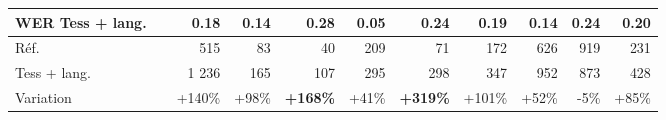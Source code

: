 {\begin{tabular}{|l|ccc|ccc|ccc|}
  WER Tess + lang.\ \ &
  \multicolumn{1}{r|}{0.18 }&
  \multicolumn{1}{r|}{0.14} &
  \multicolumn{1}{r|}{\textbf{0.28}} &
  \multicolumn{1}{r|}{0.05} &
   \multicolumn{1}{r|}{\textbf{0.24}} &
  \multicolumn{1}{r|}{0.19} &
  \multicolumn{1}{r|}{0.14} &
  \multicolumn{1}{r|}{0.24}&
  \multicolumn{1}{r|}{0.20} 
   \\ \hline
   \hline
Réf.\ &
    \multicolumn{1}{r|}{ 515}&
  \multicolumn{1}{r|}{83} &
  \multicolumn{1}{r|}{40} &
  \multicolumn{1}{r|}{209} &
  \multicolumn{1}{r|}{71} &
  \multicolumn{1}{r|}{172} &
  \multicolumn{1}{r|}{626} &
  \multicolumn{1}{r|}{919}&
  \multicolumn{1}{r|}{231} 
   \\ \hline
Tess + lang.\ &
    \multicolumn{1}{r|}{1 236} &
  \multicolumn{1}{r|}{165} &
  \multicolumn{1}{r|}{107} &
  \multicolumn{1}{r|}{295} &
  \multicolumn{1}{r|}{298} &
  \multicolumn{1}{r|}{347} &
  \multicolumn{1}{r|}{952} &
  \multicolumn{1}{r|}{873}&
  \multicolumn{1}{r|}{428} 
   \\ \hline
Variation & \multicolumn{1}{r|}{+140\%}&
\multicolumn{1}{r|}{+98\%}&
\multicolumn{1}{r|}{\textbf{+168\%}}&
\multicolumn{1}{r|}{+41\%}&
\multicolumn{1}{r|}{\textbf{+319\%}}&
\multicolumn{1}{r|}{+101\%}&
\multicolumn{1}{r|}{+52\%}&
\multicolumn{1}{r|}{-5\%}&
\multicolumn{1}{r|}{+85\%}\\
 \hline
\end{tabular}
}